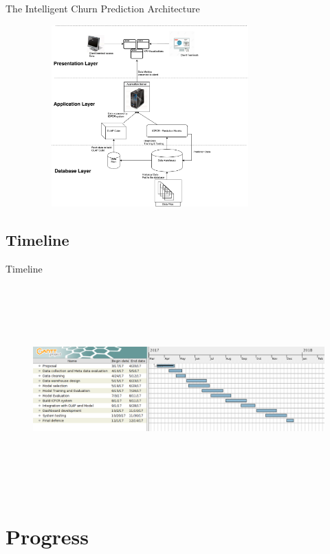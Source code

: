 \documentclass{beamer}
\begin{document}
\begin{frame}{The Intelligent Churn Prediction Architecture}
	\begin{figure}[h]
		\includegraphics[width=9cm,height=7cm]{ppt_figures/ICPCR_pic1SystemDesign}
		\centering
	\end{figure}
\end{frame}

\subsection{Timeline}
\begin{frame}{Timeline}
\begin{figure}
	\includegraphics[width=13cm, height=8cm]{ppt_figures/churngantt3.png} 
  \end{figure}
\end{frame}

\section{Progress}
\end{document}
